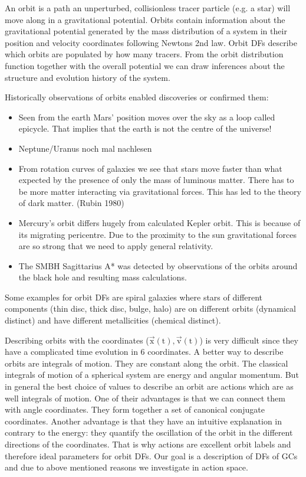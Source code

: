 \par An orbit is a path an unperturbed, collisionless tracer particle (e.g. a star) will move along in a gravitational potential. Orbits contain information about the gravitational potential generated by the mass distribution of a system in their position and velocity coordinates following Newtons 2nd law. Orbit \acp{DF} describe which orbits are populated by how many tracers. From the orbit distribution function together with the overall potential we can draw inferences about the structure and evolution history of the system. 
\par Historically observations of orbits enabled discoveries or confirmed them: 
\begin{itemize}
\item Seen from the earth Mars' position moves over the sky as a loop called epicycle. That implies that the earth is not the centre of the universe! \citep[p.3]{2006ima..book.....C}
\item Neptune/Uranus \color{red} noch mal nachlesen \color{black}
\item From rotation curves of galaxies we see that stars move faster than what expected by the presence of only the mass of luminous matter. There has to be more matter interacting via gravitational forces. This has led to the theory of dark matter. (Rubin 1980)
\item Mercury's orbit differs hugely from calculated Kepler orbit. This is because of its migrating pericentre. Due to the proximity to the sun gravitational forces are so strong that we need to apply general relativity.
\item The \ac{SMBH} Sagittarius A*  was detected by observations of the orbits around the black hole and resulting mass calculations. \citep[p.923]{2006ima..book.....C} 
\end{itemize}
\par Some examples for orbit \acp{DF} are spiral galaxies where stars of different components (thin disc, thick disc, bulge, halo) are on different orbits (dynamical distinct) and have different metallicities (chemical distinct).
\\\par Describing orbits with the coordinates (\(\vec{\mathrm{x}}(\mathrm{t}),\vec{\mathrm{v}}(\mathrm{t})\)) is very difficult since they have a complicated time evolution in 6 coordinates. A better way to describe orbits are integrals of motion. They are constant along the orbit. The classical integrals of motion of a spherical system are energy and angular momentum. But in general the best choice of values to describe an orbit are actions which are as well integrals of motion. One of their advantages is that we can connect them with angle coordinates. They form together a set of canonical conjugate coordinates. Another advantage is that they have an intuitive explanation in contrary to the energy: they quantify the oscillation of the orbit in the different directions of the coordinates. That is why actions are excellent orbit labels and therefore ideal parameters for orbit \acp{DF}. Our goal is a description of \acp{DF} of \acp{GC} and due to above mentioned reasons we investigate in action space.
